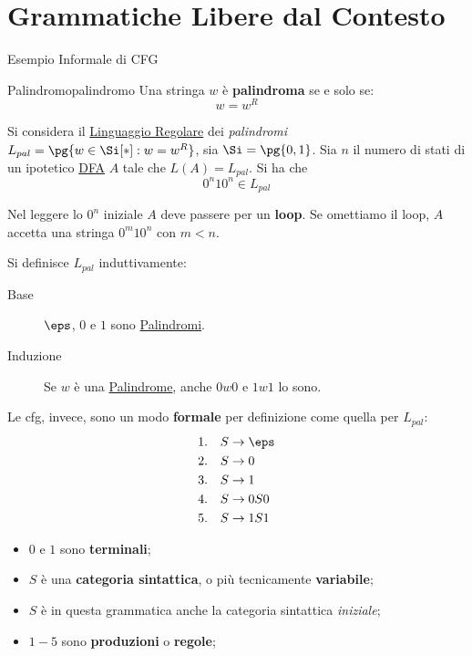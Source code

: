 \section{Grammatiche Libere dal Contesto}\label{sec:ll_grammatiche_libere_dal_contesto} %
\begin{example}{Esempio Informale di CFG}{}
    \begin{definition}{Palindromo}{palindromo}
        Una stringa $w$ è \textbf{palindroma} se e solo se:
        \[
            w = w^R
        \]
    \end{definition}
    Si considera il \hyperref[def:ling-reg]{Linguaggio Regolare} dei \textit{palindromi} $L_{pal} = \pg{w\in\Si[*]:w = w^R}$, sia $\Si = \pg{0,1}$.
    Sia $n$ il numero di stati di un ipotetico \hyperref[sub:lr_dfa]{DFA} $A$ tale che $L(A) = L_{pal}$.
    Si ha che
    \[
        0^n10^n \in L_{pal}
    \]
    \begin{note}[Contraddizione]
        Nel leggere lo $0^n$ iniziale $A$ deve passere per un \textbf{loop}.
        Se omettiamo il loop, $A$ accetta una stringa $0^m10^n$ con $m < n$.
    \end{note}
    Si definisce $L_{pal}$ induttivamente:
    \begin{description}
        \item[Base] $\eps$, $0$ e $1$ sono \hyperref[def:palindromo]{Palindromi}.
        \item[Induzione] Se $w$ è una \hyperref[def:palindromo]{Palindrome}, anche $0w0$ e $1w1$ lo sono.
    \end{description}
\end{example}
Le \ac{cfg}, invece, sono un modo \textbf{formale} per definizione come quella per $L_{pal}$:
\[
    \begin{aligned}
        & 1.\quad S \to \eps \\
        & 2.\quad S \to 0 \\
        & 3.\quad S \to 1 \\
        & 4.\quad S \to 0S0 \\
        & 5.\quad S \to 1S1 \\
    \end{aligned}
\]
\begin{itemize}
    \item $0$ e $1$ sono \textbf{terminali};
    \item $S$ è una \textbf{categoria sintattica}, o più tecnicamente \textbf{variabile};
    \item $S$ è in questa grammatica anche la categoria sintattica \textit{iniziale};
    \item $1-5$ sono \textbf{produzioni} o \textbf{regole};
\end{itemize}
